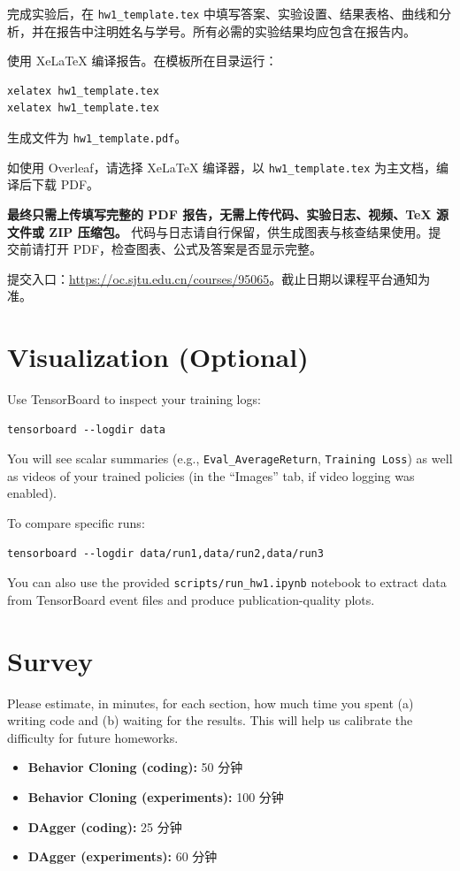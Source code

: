 \documentclass{article}
\begin{document}
完成实验后，在 \texttt{hw1\_template.tex} 中填写答案、实验设置、结果表格、曲线和分析，并在报告中注明姓名与学号。所有必需的实验结果均应包含在报告内。

使用 XeLaTeX 编译报告。在模板所在目录运行：
\begin{lstlisting}
xelatex hw1_template.tex
xelatex hw1_template.tex
\end{lstlisting}
生成文件为 \texttt{hw1\_template.pdf}。

如使用 Overleaf，请选择 XeLaTeX 编译器，以 \texttt{hw1\_template.tex} 为主文档，编译后下载 PDF。

\textbf{最终只需上传填写完整的 PDF 报告，无需上传代码、实验日志、视频、TeX 源文件或 ZIP 压缩包。} 代码与日志请自行保留，供生成图表与核查结果使用。提交前请打开 PDF，检查图表、公式及答案是否显示完整。

提交入口：\url{https://oc.sjtu.edu.cn/courses/95065}。截止日期以课程平台通知为准。

\newpage
\section{Visualization (Optional)}

Use TensorBoard to inspect your training logs:

\begin{lstlisting}
tensorboard --logdir data
\end{lstlisting}

You will see scalar summaries (e.g., \verb|Eval_AverageReturn|, \verb|Training Loss|) as well as videos of your trained policies (in the ``Images'' tab, if video logging was enabled).

To compare specific runs:
\begin{lstlisting}
tensorboard --logdir data/run1,data/run2,data/run3
\end{lstlisting}

You can also use the provided \verb|scripts/run_hw1.ipynb| notebook to extract data from TensorBoard event files and produce publication-quality plots.

\newpage
\section{Survey}
\label{sec:survey}
Please estimate, in minutes, for each section, how much time you spent (a) writing code and (b) waiting for the results. This will help us calibrate the difficulty for future homeworks.
\begin{itemize}
    \item \textbf{Behavior Cloning (coding):} 50 分钟
    \item \textbf{Behavior Cloning (experiments):} 100 分钟
    \item \textbf{DAgger (coding):} 25 分钟
    \item \textbf{DAgger (experiments):} 60 分钟
\end{itemize}
\end{document}
